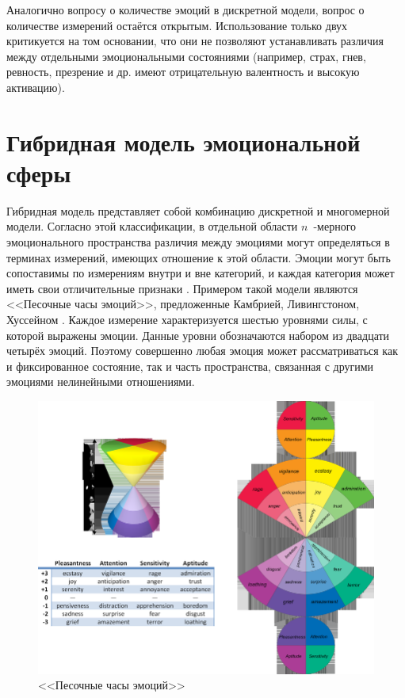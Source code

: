 Аналогично вопросу о количестве эмоций в дискретной модели, вопрос о количестве измерений остаётся открытым. Использование только двух критикуется на том основании, что они не позволяют устанавливать различия между отдельными эмоциональными состояниями (например, страх, гнев, ревность, презрение и др. имеют отрицательную валентность и высокую активацию).

\section{Гибридная модель эмоциональной сферы}
Гибридная модель представляет собой комбинацию дискретной и многомерной модели. Согласно этой классификации, в отдельной области $n$~-мерного эмоционального пространства различия между эмоциями могут определяться в терминах измерений, имеющих отношение к этой области. Эмоции могут быть сопоставимы по измерениям внутри и вне категорий, и каждая категория может иметь свои отличительные признаки \cite{Russell2003}. Примером такой модели являются <<Песочные часы эмоций>>, предложенные Камбрией, Ливингстоном, Хуссейном \cite{hourglass}. Каждое измерение характеризуется шестью уровнями
силы, с которой выражены эмоции. Данные уровни обозначаются набором из двадцати четырёх эмоций. Поэтому совершенно любая эмоция может рассматриваться как и фиксированное состояние, так и часть пространства, связанная с другими эмоциями нелинейными отношениями. 
\begin{figure}[H]
	\centering
	\includegraphics[width=0.9\linewidth]{assets/hourglass.png}
	\caption{<<Песочные часы эмоций>>}
	\label{fig:hourglass}
\end{figure}

